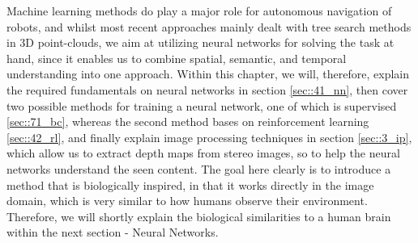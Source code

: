 
\label{sec::4_ml}





Machine learning methods do play a major role for autonomous navigation of robots, and whilst most recent approaches mainly dealt with tree search methods in 3D point-clouds, we aim at utilizing neural networks for solving the task at hand, since it enables us to combine spatial, semantic, and temporal understanding into one approach. Within this chapter, we will, therefore, explain the required fundamentals on neural networks in section \ref{sec::41_nn}, then cover two possible methods for training a neural network, one of which is supervised \ref{sec::71_bc}, whereas the second method bases on reinforcement learning \ref{sec::42_rl}, and finally explain image processing techniques in section \ref{sec::3_ip}, which allow us to extract depth maps from stereo images, so to help the neural networks understand the seen content. The goal here clearly is to introduce a method that is biologically inspired, in that it works directly in the image domain, which is very similar to how humans observe their environment. Therefore, we will shortly explain the biological similarities to a human brain within the next section - Neural Networks.